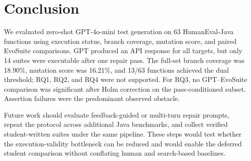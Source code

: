 \section{Conclusion}
\label{sec:conclusion}

We evaluated zero-shot GPT-4o-mini test generation on 63 HumanEval-Java functions using execution status, branch coverage, mutation score, and paired EvoSuite comparisons. GPT produced an API response for all targets, but only 14 suites were executable after one repair pass. The full-set branch coverage was 18.90\%, mutation score was 16.21\%, and 13/63 functions achieved the dual threshold; RQ1, RQ2, and RQ4 were not supported. For RQ3, no GPT--EvoSuite comparison was significant after Holm correction on the pass-conditioned subset. Assertion failures were the predominant observed obstacle.

Future work should evaluate feedback-guided or multi-turn repair prompts, repeat the protocol across additional Java benchmarks, and collect verified student-written suites under the same pipeline. These steps would test whether the execution-validity bottleneck can be reduced and would enable the deferred student comparison without conflating human and search-based baselines.
